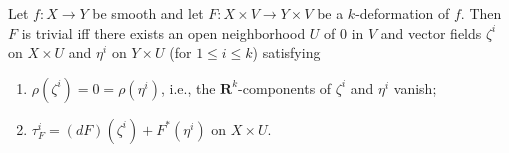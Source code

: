Let $f: X \rightarrow Y$ be smooth and let $F: X \times V \rightarrow Y \times V$ be a $k$-deformation of $f$. Then $F$ is trivial iff there exists an open neighborhood $U$ of $0$ in $V$ and vector fields $\zeta^i$ on $X \times U$ and $\eta^i$ on $Y \times U$ (for $1 \leq i \leq k$) satisfying

\begin{enumerate}
\item[(a)] $\rho(\zeta^i) = 0 = \rho(\eta^i)$, \quad i.e., the $\mathbf{R}^k$-components of $\zeta^i$ and $\eta^i$ vanish;
\item[(b)] $\tau_F^i = (dF)(\zeta^i) + F^*(\eta^i)$ on $X \times U$.
\end{enumerate}
